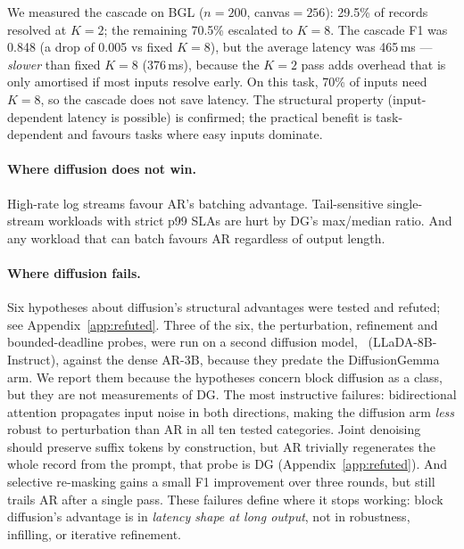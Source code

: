 We measured the cascade on BGL ($n{=}200$, canvas$=256$): 29.5\% of
records resolved at $K{=}2$; the remaining 70.5\% escalated to
$K{=}8$. The cascade F1 was 0.848 (a drop of 0.005 vs fixed $K{=}8$),
but the average latency was 465\,ms --- \emph{slower} than fixed
$K{=}8$ (376\,ms), because the $K{=}2$ pass adds overhead that is
only amortised if most inputs resolve early. On this task, 70\% of
inputs need $K{=}8$, so the cascade does not save latency. The
structural property (input-dependent latency is possible) is
confirmed; the practical benefit is task-dependent and favours tasks
where easy inputs dominate.

\paragraph{Where diffusion does not win.}

High-rate log streams favour AR's batching advantage. Tail-sensitive
single-stream workloads with strict p99 SLAs are hurt by DG's
max/median ratio. And any workload that can batch favours AR
regardless of output length.

\paragraph{Where diffusion fails.}

Six hypotheses about diffusion's structural advantages were tested and
refuted; see Appendix~\ref{app:refuted}. Three of the six, the
perturbation, refinement and bounded-deadline probes, were run on a
second diffusion model, \LLaDA\ (LLaDA-8B-Instruct), against the dense
AR-3B, because they predate the DiffusionGemma arm. We report them
because the hypotheses concern block diffusion as a class, but they
are not measurements of DG. The most instructive failures: bidirectional
attention propagates input noise in both directions, making the
diffusion arm \emph{less} robust to perturbation than AR in all ten
tested categories. Joint denoising should preserve suffix tokens by
construction, but AR trivially regenerates the whole record from the
prompt, that probe is DG (Appendix~\ref{app:refuted}). And selective
re-masking gains a small F1 improvement over three rounds, but still
trails AR after a single pass. These failures
define where it stops working: block diffusion's advantage is in
\emph{latency shape at long output}, not in robustness, infilling, or
iterative refinement.

